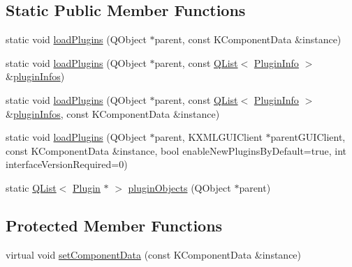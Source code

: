 \subsection*{Static Public Member Functions}
\begin{DoxyCompactItemize}
\item 
static void \hyperlink{classKParts_1_1Plugin_a66590bc55db365f880417d14f7ba38d0}{load\+Plugins} (Q\+Object $\ast$parent, const K\+Component\+Data \&instance)
\item 
static void \hyperlink{classKParts_1_1Plugin_a1634580342d43bf995041047e818f4a1}{load\+Plugins} (Q\+Object $\ast$parent, const \hyperlink{classQList}{Q\+List}$<$ \hyperlink{structKParts_1_1Plugin_1_1PluginInfo}{Plugin\+Info} $>$ \&\hyperlink{classKParts_1_1Plugin_a00fa7c83044416dbe32dcef7672fb7a5}{plugin\+Infos})
\item 
static void \hyperlink{classKParts_1_1Plugin_aef449c965dc8b644ed6502d7543891c7}{load\+Plugins} (Q\+Object $\ast$parent, const \hyperlink{classQList}{Q\+List}$<$ \hyperlink{structKParts_1_1Plugin_1_1PluginInfo}{Plugin\+Info} $>$ \&\hyperlink{classKParts_1_1Plugin_a00fa7c83044416dbe32dcef7672fb7a5}{plugin\+Infos}, const K\+Component\+Data \&instance)
\item 
static void \hyperlink{classKParts_1_1Plugin_a6f28c0e34f43edcc9cff5f6d474e8e01}{load\+Plugins} (Q\+Object $\ast$parent, K\+X\+M\+L\+G\+U\+I\+Client $\ast$parent\+G\+U\+I\+Client, const K\+Component\+Data \&instance, bool enable\+New\+Plugins\+By\+Default=true, int interface\+Version\+Required=0)
\item 
static \hyperlink{classQList}{Q\+List}$<$ \hyperlink{classKParts_1_1Plugin}{Plugin} $\ast$ $>$ \hyperlink{classKParts_1_1Plugin_ad53945bdaf59d6f0e1747c9106be9254}{plugin\+Objects} (Q\+Object $\ast$parent)
\end{DoxyCompactItemize}
\subsection*{Protected Member Functions}
\begin{DoxyCompactItemize}
\item 
virtual void \hyperlink{classKParts_1_1Plugin_a2406655ff0eb285c16516574cec136eb}{set\+Component\+Data} (const K\+Component\+Data \&instance)
\end{DoxyCompactItemize}
